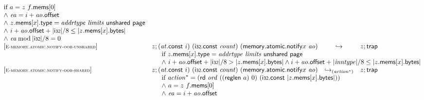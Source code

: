 $$\begin{array}[t]{@{}lrcl@{}l@{}}
\begin{array}[t]{@{}l@{}}
\mbox{if}~ a = z~f{.}\mathsf{mems}{}[0] \\
{\land}~ {\mathit{ea}} = i + {\mathit{ao}}{.}\mathsf{offset} \\
{\land}~ z{.}\mathsf{mems}{}[x]{.}\mathsf{type} = {\mathit{addrtype}}~{\mathit{limits}}~\mathsf{unshared}~\mathsf{page} \\
{\land}~ i + {\mathit{ao}}{.}\mathsf{offset} + {|\mathsf{i{\scriptstyle 32}}|} / 8 \leq {|z{.}\mathsf{mems}{}[x]{.}\mathsf{bytes}|} \\
{\land}~ {\mathit{ea}} \mathbin{\mathrm{mod}} {|\mathsf{i{\scriptstyle 32}}|} / 8 = 0 \\
\end{array} \\
{[\textsc{\scriptsize E{-}memory.atomic.notify{-}oob{-}unshared}]} \quad & z ; ({\mathit{at}}{.}\mathsf{const}~i)~(\mathsf{i{\scriptstyle 32}}{.}\mathsf{const}~{\mathit{count}})~({\mathsf{memory{.}atomic{.}notify}}{x}~{\mathit{ao}}) & \hookrightarrow & z ; \mathsf{trap} &  \\
& \multicolumn{4}{@{}l@{}}{\quad
\quad
\begin{array}[t]{@{}l@{}}
\mbox{if}~ z{.}\mathsf{mems}{}[x]{.}\mathsf{type} = {\mathit{addrtype}}~{\mathit{limits}}~\mathsf{unshared}~\mathsf{page} \\
{\land}~ i + {\mathit{ao}}{.}\mathsf{offset} + {|\mathsf{i{\scriptstyle 32}}|} / 8 > {|z{.}\mathsf{mems}{}[x]{.}\mathsf{bytes}|} \land i + {\mathit{ao}}{.}\mathsf{offset} + {|{\mathit{inntype}}|} / 8 \leq {|z{.}\mathsf{mems}{}[x]{.}\mathsf{bytes}|} \\
\end{array}
} \\
{[\textsc{\scriptsize E{-}memory.atomic.notify{-}oob{-}shared}]} \quad & z ; ({\mathit{at}}{.}\mathsf{const}~i)~(\mathsf{i{\scriptstyle 32}}{.}\mathsf{const}~{\mathit{count}})~({\mathsf{memory{.}atomic{.}notify}}{x}~{\mathit{ao}}) & {\hookrightarrow}_{({{\mathit{action}}^\ast})} {} & z ; \mathsf{trap} &  \\
& \multicolumn{4}{@{}l@{}}{\quad
\quad
\begin{array}[t]{@{}l@{}}
\mbox{if}~ {{\mathit{action}}^\ast} = (\mathsf{rd}~{\mathit{ord}}~((\mathsf{reglen}~a)~0)~(\mathsf{i{\scriptstyle 32}}{.}\mathsf{const}~{|z{.}\mathsf{mems}{}[x]{.}\mathsf{bytes}|})) \\
{\land}~ a = z~f{.}\mathsf{mems}{}[0] \\
{\land}~ {\mathit{ea}} = i + {\mathit{ao}}{.}\mathsf{offset} \\

\end{array}}
\end{array}$$
